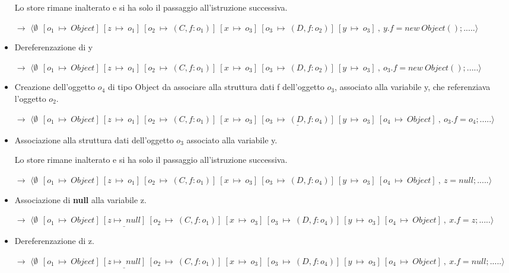 \begin{itemize}
Lo store rimane inalterato e si ha solo il passaggio all'istruzione successiva.

$\rightarrow$ $\langle\emptyset\:\:[o_1\:\mapsto\:Object]\:[z\:\mapsto\:o_1]\:[o_2\:\mapsto\:(C,f:o_1)]\:[x\:\mapsto\:o_3]\:[o_3\:\mapsto\:(D,f:o_2)]\:[y\:\mapsto\:o_3]\:,\:y.f=new\:Object();.....\rangle$

\vspace{0,5cm}
\item Dereferenzazione di y

$\rightarrow$ $\langle\emptyset\:\:[o_1\:\mapsto\:Object]\:[z\:\mapsto\:o_1]\:[o_2\:\mapsto\:(C,f:o_1)]\:[x\:\mapsto\:o_3]\:[o_3\:\mapsto\:(D,f:o_2)]\:[y\:\mapsto\:o_3]\:,\:o_3.f=new\:Object();.....\rangle$

\vspace{0,5cm}
\item Creazione dell'oggetto $o_4$ di tipo Object da associare alla struttura dati f dell'oggetto $o_3$, associato alla variabile y, che referenziava l'oggetto $o_2$.

$\rightarrow$ $\langle\emptyset\:\:[o_1\:\mapsto\:Object]\:[z\:\mapsto\:o_1]\:[o_2\:\mapsto\:(C,f:o_1)]\:[x\:\mapsto\:o_3]\:\underline{[o_3\:\mapsto\:(D,f:o_4)]}\:[y\:\mapsto\:o_3]\:[o_4\:\mapsto\:Object]\:,\:o_3.f=o_4;.....\rangle$

\vspace{0,5cm}
\item Associazione alla struttura dati dell'oggetto $o_3$ associato alla variabile y.

Lo store rimane inalterato e si ha solo il passaggio all'istruzione successiva.

$\rightarrow$ $\langle\emptyset\:\:[o_1\:\mapsto\:Object]\:[z\:\mapsto\:o_1]\:[o_2\:\mapsto\:(C,f:o_1)]\:[x\:\mapsto\:o_3]\:[o_3\:\mapsto\:(D,f:o_4)]\:[y\:\mapsto\:o_3]\:[o_4\:\mapsto\:Object]\:,\:z=null;.....\rangle$

\vspace{0,5cm}
\item Associazione di \textbf{null} alla variabile z. 

$\rightarrow$ $\langle\emptyset\:\:[o_1\:\mapsto\:Object]\:\underline{[z\mapsto\:null]}\:[o_2\:\mapsto\:(C,f:o_1)]\:[x\:\mapsto\:o_3]\:[o_3\:\mapsto\:(D,f:o_4)]\:[y\:\mapsto\:o_3]\:[o_4\:\mapsto\:Object]\:,\:x.f=z;.....\rangle$

\vspace{0,5cm}
\item Dereferenzazione di z.

$\rightarrow$ $\langle\emptyset\:\:[o_1\:\mapsto\:Object]\:\underline{[z\mapsto\:null]}\:[o_2\:\mapsto\:(C,f:o_1)]\:[x\:\mapsto\:o_3]\:[o_3\:\mapsto\:(D,f:o_4)]\:[y\:\mapsto\:o_3]\:[o_4\:\mapsto\:Object]\:,\:x.f=null;.....\rangle$


\end{itemize}
